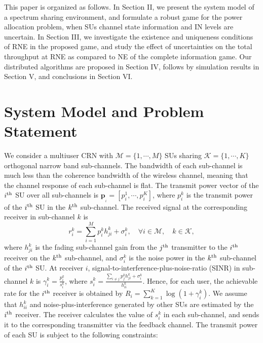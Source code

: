 \documentclass[peerreview,onecolumn,11pt,draftclsnofoot]{IEEEtran}\usepackage{amsmath}\usepackage{amsfonts}\usepackage{epsfig}\usepackage{amssymb}\usepackage{graphicx}\usepackage{amssymb,amsmath}\usepackage{cite}\usepackage{color,soul}\newcommand\T{\rule{0pt}{3.1ex}}
\begin{document}
This paper is organized as follows. In Section II, we present the system model of a spectrum sharing environment, and formulate a robust game for the power allocation problem, when SUs channel state information and IN levels are uncertain. In Section III, we investigate the existence and uniqueness conditions of RNE in the proposed game, and study the effect of uncertainties on the total throughput at RNE as compared to NE of the complete information game. Our distributed algorithms are proposed in Section IV, follows by simulation results in Section V, and conclusions in Section VI.

\section{System Model and Problem Statement}
We consider a multiuser CRN with $\mathcal{M}=\{1,\cdots, M\}$ SUs sharing $\mathcal{K}=\{1,\cdots,K\}$ orthogonal narrow band sub-channels. The bandwidth of each sub-channel is much less than the coherence bandwidth of the wireless channel, meaning that the channel response of each sub-channel is flat. The transmit power vector of the $i^{\scriptsize{\textnormal{th}}}$ SU over all sub-channels is $\mathbf{p}_{_i}=[p^{1}_{i},\cdots,p^{K}_{i}]$, where $p^{k}_{i}$ is the transmit power of the $i^{\scriptsize{\textnormal{th}}}$ SU in the $k^{\scriptsize{\textnormal{th}}}$ sub-channel. The received signal at the corresponding receiver in sub-channel $k$ is
\begin{equation}\label{recive}
    r^{k}_{i}=\sum^{M}_{i=1} p^{k}_{i}h^{k}_{ji}+\sigma_{i}^{k}, \quad
    \forall i \in \mathcal{M} , \quad  k \in \mathcal{K},
\end{equation}
where $h^{k}_{ji}$ is the fading sub-channel gain from the $j^{\scriptsize{\textnormal{th}}}$ transmitter to the
$i^{\scriptsize{\textnormal{th}}}$ receiver on the
$k^{\scriptsize{\textnormal{th}}}$ sub-channel, and
$\sigma_{i}^{k}$ is the noise power in the $k^{\scriptsize{\textnormal{th}}}$ sub-channel of the
$i^{\scriptsize{\textnormal{th}}}$ SU. At receiver $i$, signal-to-interference-plus-noise-ratio (SINR) in sub-channel $k$ is
$\gamma^{k}_{i}= \frac{p^{k}_{i}}{s^{k}_{i}}$,
where $s^{k}_{i}=\frac{\sum_{i\neq j}
p^{k}_{j}h^{k}_{ji}+\sigma_{i}^{k}}{h_{ii}^{k}}$. Hence, for each
user, the achievable rate for the
$i^{{\scriptsize{\textnormal{th}}}}$ receiver is obtained by
$R_i= \sum_{k=1}^{K}\log(1+ \gamma^{k}_{i})$. We assume that $h^{k}_{ii}$ and noise-plus-interference generated by other SUs are estimated by the $i^{\scriptsize{\textnormal{th}}}$ receiver. The receiver calculates the value of $s_{i}^{k}$ in each sub-channel, and sends it to the corresponding transmitter via the feedback channel. The transmit power of each SU is subject to the following constraints:
\end{document}
